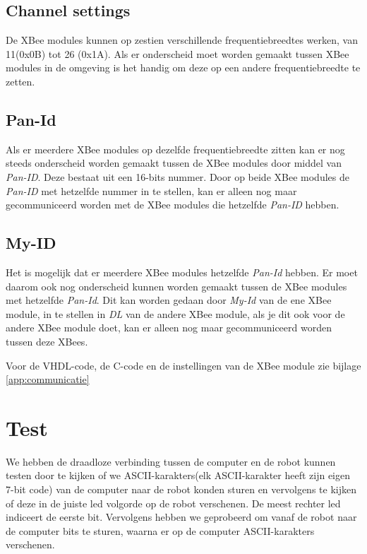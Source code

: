 \documentclass{report}
\begin{document}
\subsection{Channel settings}
De XBee modules kunnen op zestien verschillende frequentiebreedtes werken, van 11(0x0B) tot 26 (0x1A).
Als er onderscheid moet worden gemaakt tussen XBee modules in de omgeving is het handig om deze op een andere frequentiebreedte te zetten.\\

\subsection{Pan-Id}
Als er meerdere XBee modules op dezelfde frequentiebreedte zitten kan er nog steeds onderscheid worden gemaakt tussen de XBee modules door middel van \textit{Pan-ID}.
Deze bestaat uit een 16-bits nummer.
Door op beide XBee modules de \textit{Pan-ID}  met hetzelfde nummer in te stellen, kan er alleen nog maar gecommuniceerd worden met de XBee modules die hetzelfde \textit{Pan-ID} hebben.

\subsection{My-ID}
Het is mogelijk dat er meerdere XBee modules hetzelfde\textit{ Pan-Id} hebben.
Er moet daarom ook nog onderscheid kunnen worden gemaakt tussen de XBee modules met hetzelfde \textit{Pan-Id}.
Dit kan worden gedaan door \textit{My-Id} van de ene XBee module, in te stellen in \textit{DL} van de andere XBee module, als je dit ook voor de andere XBee module doet, kan er alleen nog maar gecommuniceerd worden tussen deze XBees.


Voor de VHDL-code, de C-code en de instellingen van de XBee module zie bijlage \ref{app:communicatie}

\section{Test}

We hebben de draadloze verbinding tussen de computer en de robot kunnen testen door te kijken of we ASCII-karakters(elk ASCII-karakter heeft zijn eigen 7-bit code) van de computer naar de robot konden sturen en vervolgens te kijken of deze in de juiste led volgorde op de robot verschenen. De meest rechter led indiceert de eerste bit. Vervolgens hebben we geprobeerd om vanaf de robot naar de computer bits te sturen, waarna er op de computer ASCII-karakters verschenen.
\end{document}
